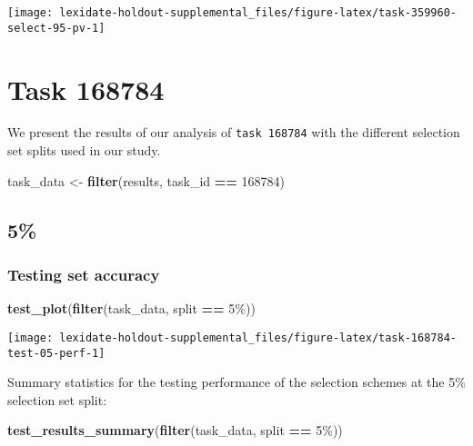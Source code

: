 \documentclass[
]{book}
\newenvironment{Shaded}{\begin{snugshade}}{\end{snugshade}}
\newcommand{\DecValTok}[1]{\textcolor[rgb]{0.00,0.00,0.81}{#1}}
\newcommand{\FunctionTok}[1]{\textcolor[rgb]{0.13,0.29,0.53}{\textbf{#1}}}
\newcommand{\NormalTok}[1]{#1}
\newcommand{\OtherTok}[1]{\textcolor[rgb]{0.56,0.35,0.01}{#1}}
\newcommand{\SpecialCharTok}[1]{\textcolor[rgb]{0.81,0.36,0.00}{\textbf{#1}}}
\newcommand{\StringTok}[1]{\textcolor[rgb]{0.31,0.60,0.02}{#1}}
\begin{document}
\texttt{[image: lexidate-holdout-supplemental\_files/figure-latex/task-359960-select-95-pv-1]}

\hypertarget{task-168784}{%
\chapter{Task 168784}\label{task-168784}}

We present the results of our analysis of \texttt{task\ 168784} with the different selection set splits used in our study.

\begin{Shaded}
\begin{Highlighting}[]
\NormalTok{task\_data }\OtherTok{\textless{}{-}} \FunctionTok{filter}\NormalTok{(results, task\_id }\SpecialCharTok{==} \DecValTok{168784}\NormalTok{)}
\end{Highlighting}
\end{Shaded}

\hypertarget{section-50}{%
\section{5\%}\label{section-50}}

\hypertarget{testing-set-accuracy-50}{%
\subsection{Testing set accuracy}\label{testing-set-accuracy-50}}

\begin{Shaded}
\begin{Highlighting}[]
\FunctionTok{test\_plot}\NormalTok{(}\FunctionTok{filter}\NormalTok{(task\_data, split }\SpecialCharTok{==} \StringTok{\textquotesingle{}5\%\textquotesingle{}}\NormalTok{))}
\end{Highlighting}
\end{Shaded}

\texttt{[image: lexidate-holdout-supplemental\_files/figure-latex/task-168784-test-05-perf-1]}

Summary statistics for the testing performance of the selection schemes at the 5\% selection set split:

\begin{Shaded}
\begin{Highlighting}[]
\FunctionTok{test\_results\_summary}\NormalTok{(}\FunctionTok{filter}\NormalTok{(task\_data, split }\SpecialCharTok{==} \StringTok{\textquotesingle{}5\%\textquotesingle{}}\NormalTok{))}
\end{Highlighting}
\end{Shaded}
\end{document}

